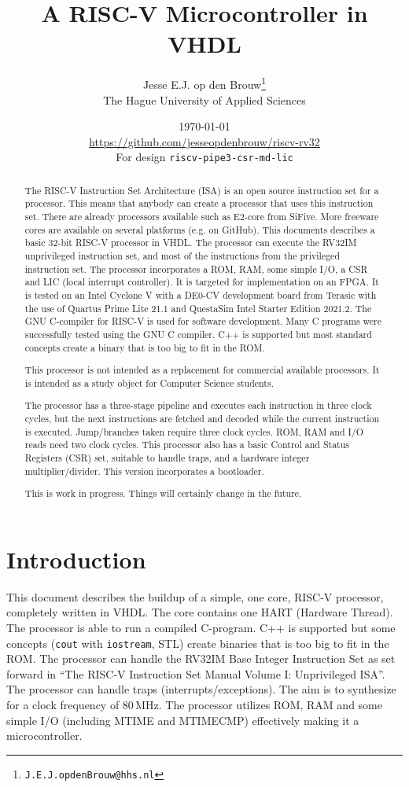 \documentclass[12pt]{article}
\author{Jesse E.J. op den Brouw\thanks{\texttt{J.E.J.opdenBrouw@hhs.nl}}\\[2ex]The Hague University of Applied Sciences}
\title{A RISC-V Microcontroller in VHDL}
\date{\today\\[2ex]\normalsize\url{https://github.com/jesseopdenbrouw/riscv-rv32}\\[2ex]For design \texttt{riscv-pipe3-csr-md-lic}}
\begin{document}
\maketitle

\vfill
\begin{abstract}
\baselineskip
\noindent
The RISC-V Instruction Set Architecture (ISA) is an open source instruction set for a processor. This means that anybody can create a processor that uses this instruction set. There are already processors available such as E2-core from SiFive. More freeware cores are available on several platforms (e.g. on GitHub). This documents describes a basic 32-bit RISC-V processor in VHDL. The processor can execute the RV32IM unprivileged instruction set, and most of the instructions from the privileged instruction set. The processor incorporates a ROM, RAM, some simple I/O, a CSR and LIC (local interrupt controller). It is targeted for implementation on an FPGA. It is tested on an Intel Cyclone V with a DE0-CV development board from Terasic with the use of Quartus Prime Lite 21.1 and QuestaSim Intel Starter Edition 2021.2. The GNU C-compiler for RISC-V is used for software development. Many C programs were successfully tested using the GNU C compiler. C++ is supported but most standard concepts create a binary that is too big to fit in the ROM.

\noindent
This processor is not intended as a replacement for commercial available processors. It is intended as a study object for Computer Science students.

\noindent
The processor has a three-stage pipeline and executes each instruction in three clock cycles, but the next instructions are fetched and decoded while the current instruction is executed. Jump/branches taken require three clock cycles. ROM, RAM and I/O reads need two clock cycles. This processor also has a basic Control and Status Registers (CSR) set, suitable to handle traps, and a hardware integer multiplier/divider. This version incorporates a bootloader.

\noindent
This is work in progress. Things will certainly change in the future.
\end{abstract}
\vfill

\clearpage
\tableofcontents

\clearpage
\section{Introduction}
This document describes the buildup of a simple, one core, RISC-V processor, completely written in VHDL. The core contains one HART (Hardware Thread). The processor is able to run a compiled C-program. C++ is supported but some concepts (\texttt{cout} with \texttt{iostream}, STL) create binaries that is too big to fit in the ROM. The processor can handle the RV32IM Base Integer Instruction Set as set forward in ``The RISC-V Instruction Set Manual Volume I: Unprivileged ISA''. The processor can handle traps (interrupts/exceptions). The aim is to synthesize for a clock frequency of 80\,MHz. The processor utilizes ROM, RAM and some simple I/O (including MTIME and MTIMECMP) effectively making it a microcontroller.
\end{document}
